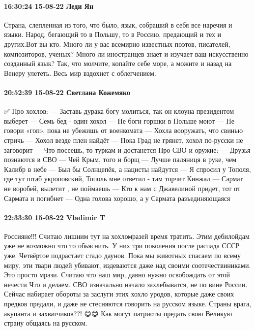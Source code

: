 \paragraph{16:30:24 15-08-22 Леди Ян}

Страна, слепленная из того, что было, язык, собраший в себя все наречия и
языки. Народ, бегающий то в Польшу, то в Россию, предающий и тех и других.Вот
вы кто. Много ли у вас всемирно известных поэтов, писателей, композиторов,
ученых? Много ли иностранцев знает и изучает ваш искусственно созданный язык?
Так, что молчите, копайте себе море, а можите и назад на Венеру улететь. Весь
мир вздохнет с облегчением.

\paragraph{20:52:39 15-08-22 Светлана Кожемяко}

\obeycr
✅ Про хохлов:
— Заставь дурака богу молиться, так он клоуна президентом выберет
— Семь бед - один хохол
— Не боги горшки в Польше моют
— Не говори «гоп», пока не убежишь от военкомата
— Хохла вооружать, что свинью стричь
— Хохол везде плен найдёт
— Пока Град не грянет, хохол по-русски не заговорит
— Что посеешь, то туркам и достанется
Про СВО и оружие:
— Друзья познаются в СВО
— Чей Крым, того и борщ
— Лучше паляниця в руке, чем Калибр в небе
— Был бы Солнцепёк, а нацисты найдутся
— Я спросил у Тополя, где тут штаб укроповский, Тополь мне ответил - там торчит Кинжал
— Сармат не воробей, вылетит , не поймаешь
— Кто к нам с Джавелиной придет, тот от Сармата и погибнет
— Одна голова хорошо, а у Сармата разъединяющаяся
\restorecr

\paragraph{22:33:30 15-08-22 Vladimir T}

\obeycr
Россияне!!!
Считаю лишним тут на хохломразей время тратить. Этим дебилойдам уже не возможно что то обьяснить.
У них три поколения после распада СССР уже. Четвёртое подрастает стадо даунов.
Пока мы животных спасаем по всему миру, эти твари людей убивают, издеваются даже над своими соотечествиниками. Это просто мрази.
Считаю что наш мир, давно нужно освобождать от этой нечести
Что и делаем.
СВО изначально начало захлебыватся, не по вине России.
Сейчас набирает обороты за заслуги этих хохло уродов, которые даже своих предков предали, и даже не стесняются говорить на русском языке. Страны врага, акупанта и захватчиков??! 😄😄
Как могут патриоты предать свою Великую страну общаясь на русском.
\restorecr


